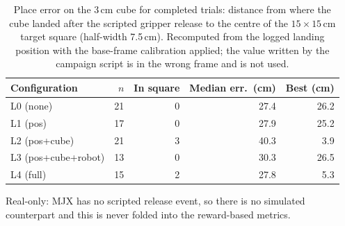 \begin{table}[h]
\centering
\caption{Place error on the 3\,cm cube for completed trials: distance from where the cube landed after the scripted gripper release to the centre of the $15 \times 15$\,cm target square (half-width 7.5\,cm). Recomputed from the logged landing position with the base-frame calibration applied; the value written by the campaign script is in the wrong frame and is not used.}
\label{tab:place_error}
\begin{tabular}{lrrrr}
\hline
\textbf{Configuration} & \textbf{$n$} & \textbf{In square} & \textbf{Median err.\ (cm)} & \textbf{Best (cm)} \\
\hline
L0 (none) & 21 & 0 & 27.4 & 26.2 \\
L1 (pos) & 17 & 0 & 27.9 & 25.2 \\
L2 (pos+cube) & 21 & 3 & 40.3 & 3.9 \\
L3 (pos+cube+robot) & 13 & 0 & 30.3 & 26.5 \\
L4 (full) & 15 & 2 & 27.8 & 5.3 \\
\hline
\end{tabular}

\vspace{2pt}
\begin{minipage}{0.95\linewidth}
\footnotesize Real-only: MJX has no scripted release event, so there is no simulated counterpart and this is never folded into the reward-based metrics.
\end{minipage}
\end{table}

